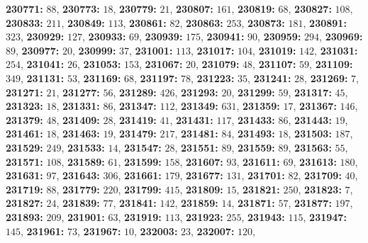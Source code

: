 \textsf{\bfseries 230771:} $88$, \textsf{\bfseries 230773:} $18$, \textsf{\bfseries 230779:} $21$, \textsf{\bfseries 230807:} $161$, \textsf{\bfseries 230819:} $68$, \textsf{\bfseries 230827:} $108$, \textsf{\bfseries 230833:} $211$, \textsf{\bfseries 230849:} $113$, \textsf{\bfseries 230861:} $82$, \textsf{\bfseries 230863:} $253$, \textsf{\bfseries 230873:} $181$, \textsf{\bfseries 230891:} $323$, \textsf{\bfseries 230929:} $127$, \textsf{\bfseries 230933:} $69$, \textsf{\bfseries 230939:} $175$, \textsf{\bfseries 230941:} $90$, \textsf{\bfseries 230959:} $294$, \textsf{\bfseries 230969:} $89$, \textsf{\bfseries 230977:} $20$, \textsf{\bfseries 230999:} $37$, \textsf{\bfseries 231001:} $113$, \textsf{\bfseries 231017:} $104$, \textsf{\bfseries 231019:} $142$, \textsf{\bfseries 231031:} $254$, \textsf{\bfseries 231041:} $26$, \textsf{\bfseries 231053:} $153$, \textsf{\bfseries 231067:} $20$, \textsf{\bfseries 231079:} $48$, \textsf{\bfseries 231107:} $59$, \textsf{\bfseries 231109:} $349$, \textsf{\bfseries 231131:} $53$, \textsf{\bfseries 231169:} $68$, \textsf{\bfseries 231197:} $78$, \textsf{\bfseries 231223:} $35$, \textsf{\bfseries 231241:} $28$, \textsf{\bfseries 231269:} $7$, \textsf{\bfseries 231271:} $21$, \textsf{\bfseries 231277:} $56$, \textsf{\bfseries 231289:} $426$, \textsf{\bfseries 231293:} $20$, \textsf{\bfseries 231299:} $59$, \textsf{\bfseries 231317:} $45$, \textsf{\bfseries 231323:} $18$, \textsf{\bfseries 231331:} $86$, \textsf{\bfseries 231347:} $112$, \textsf{\bfseries 231349:} $631$, \textsf{\bfseries 231359:} $17$, \textsf{\bfseries 231367:} $146$, \textsf{\bfseries 231379:} $48$, \textsf{\bfseries 231409:} $28$, \textsf{\bfseries 231419:} $41$, \textsf{\bfseries 231431:} $117$, \textsf{\bfseries 231433:} $86$, \textsf{\bfseries 231443:} $19$, \textsf{\bfseries 231461:} $18$, \textsf{\bfseries 231463:} $19$, \textsf{\bfseries 231479:} $217$, \textsf{\bfseries 231481:} $84$, \textsf{\bfseries 231493:} $18$, \textsf{\bfseries 231503:} $187$, \textsf{\bfseries 231529:} $249$, \textsf{\bfseries 231533:} $14$, \textsf{\bfseries 231547:} $28$, \textsf{\bfseries 231551:} $89$, \textsf{\bfseries 231559:} $89$, \textsf{\bfseries 231563:} $55$, \textsf{\bfseries 231571:} $108$, \textsf{\bfseries 231589:} $61$, \textsf{\bfseries 231599:} $158$, \textsf{\bfseries 231607:} $93$, \textsf{\bfseries 231611:} $69$, \textsf{\bfseries 231613:} $180$, \textsf{\bfseries 231631:} $97$, \textsf{\bfseries 231643:} $306$, \textsf{\bfseries 231661:} $179$, \textsf{\bfseries 231677:} $131$, \textsf{\bfseries 231701:} $82$, \textsf{\bfseries 231709:} $40$, \textsf{\bfseries 231719:} $88$, \textsf{\bfseries 231779:} $220$, \textsf{\bfseries 231799:} $415$, \textsf{\bfseries 231809:} $15$, \textsf{\bfseries 231821:} $250$, \textsf{\bfseries 231823:} $7$, \textsf{\bfseries 231827:} $24$, \textsf{\bfseries 231839:} $77$, \textsf{\bfseries 231841:} $142$, \textsf{\bfseries 231859:} $14$, \textsf{\bfseries 231871:} $57$, \textsf{\bfseries 231877:} $197$, \textsf{\bfseries 231893:} $209$, \textsf{\bfseries 231901:} $63$, \textsf{\bfseries 231919:} $113$, \textsf{\bfseries 231923:} $255$, \textsf{\bfseries 231943:} $115$, \textsf{\bfseries 231947:} $145$, \textsf{\bfseries 231961:} $73$, \textsf{\bfseries 231967:} $10$, \textsf{\bfseries 232003:} $23$, \textsf{\bfseries 232007:} $120$, 
